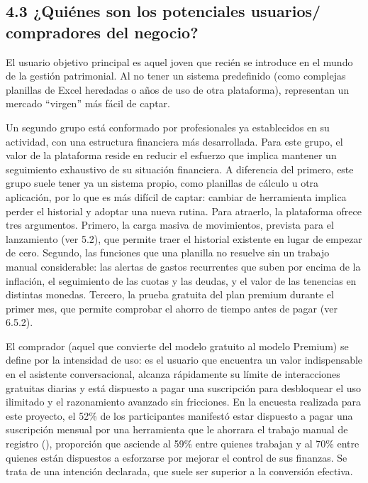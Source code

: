 \subsection*{4.3 ¿Quiénes son los potenciales usuarios/ compradores del
negocio?}\label{quiuxe9nes-son-los-potenciales-usuarios-compradores-del-negocio}

El usuario objetivo principal es aquel joven que recién se introduce en
el mundo de la gestión patrimonial. Al no tener un sistema predefinido
(como complejas planillas de Excel heredadas o años de uso de otra
plataforma), representan un mercado ``virgen'' más fácil de captar.

Un segundo grupo está conformado por profesionales ya establecidos en su
actividad, con una estructura financiera más desarrollada. Para este
grupo, el valor de la plataforma reside en reducir el esfuerzo que
implica mantener un seguimiento exhaustivo de su situación financiera. A
diferencia del primero, este grupo suele tener ya un sistema propio,
como planillas de cálculo u otra aplicación, por lo que es más difícil
de captar: cambiar de herramienta implica perder el historial y adoptar
una nueva rutina. Para atraerlo, la plataforma ofrece tres argumentos.
Primero, la carga masiva de movimientos, prevista para el lanzamiento
(ver 5.2), que permite traer el historial existente en lugar de empezar
de cero. Segundo, las funciones que una planilla no resuelve sin un
trabajo manual considerable: las alertas de gastos recurrentes que suben
por encima de la inflación, el seguimiento de las cuotas y las deudas, y
el valor de las tenencias en distintas monedas. Tercero, la prueba
gratuita del plan premium durante el primer mes, que permite comprobar
el ahorro de tiempo antes de pagar (ver 6.5.2).

El comprador (aquel que convierte del modelo gratuito al modelo Premium)
se define por la intensidad de uso: es el usuario que encuentra un valor
indispensable en el asistente conversacional, alcanza rápidamente su
límite de interacciones gratuitas diarias y está dispuesto a pagar una
suscripción para desbloquear el uso ilimitado y el razonamiento avanzado
sin fricciones. En la encuesta realizada para este proyecto, el 52\% de
los participantes manifestó estar dispuesto a pagar una suscripción
mensual por una herramienta que le ahorrara el trabajo manual de
registro (),
proporción que asciende al 59\% entre quienes trabajan y al 70\% entre
quienes están dispuestos a esforzarse por mejorar el control de sus
finanzas. Se trata de una intención declarada, que suele ser superior a
la conversión efectiva.

